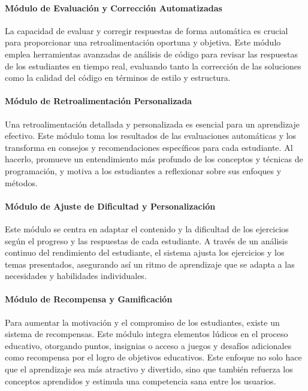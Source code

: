 \paragraph{Módulo de Evaluación y Corrección Automatizadas}

La capacidad de evaluar y corregir respuestas de forma automática es crucial para proporcionar una retroalimentación oportuna y objetiva. Este módulo emplea herramientas avanzadas de análisis de código para revisar las respuestas de los estudiantes en tiempo real, evaluando tanto la corrección de las soluciones como la calidad del código en términos de estilo y estructura.

\paragraph{Módulo de Retroalimentación Personalizada}

Una retroalimentación detallada y personalizada es esencial para un aprendizaje efectivo. Este módulo toma los resultados de las evaluaciones automáticas y los transforma en consejos y recomendaciones específicos para cada estudiante. Al hacerlo, promueve un entendimiento más profundo de los conceptos y técnicas de programación, y motiva a los estudiantes a reflexionar sobre sus enfoques y métodos.

\paragraph{Módulo de Ajuste de Dificultad y Personalización}

Este módulo se centra en adaptar el contenido y la dificultad de los ejercicios según el progreso y las respuestas de cada estudiante. A través de un análisis continuo del rendimiento del estudiante, el sistema ajusta los ejercicios y los temas presentados, asegurando así un ritmo de aprendizaje que se adapta a las necesidades y habilidades individuales.


\paragraph{Módulo de Recompensa y Gamificación}

Para aumentar la motivación y el compromiso de los estudiantes, existe un sistema de recompensas. Este módulo integra elementos lúdicos en el proceso educativo, otorgando puntos, insignias o acceso a juegos y desafíos adicionales como recompensa por el logro de objetivos educativos. Este enfoque no solo hace que el aprendizaje sea más atractivo y divertido, sino que también refuerza los conceptos aprendidos y estimula una competencia sana entre los usuarios.

